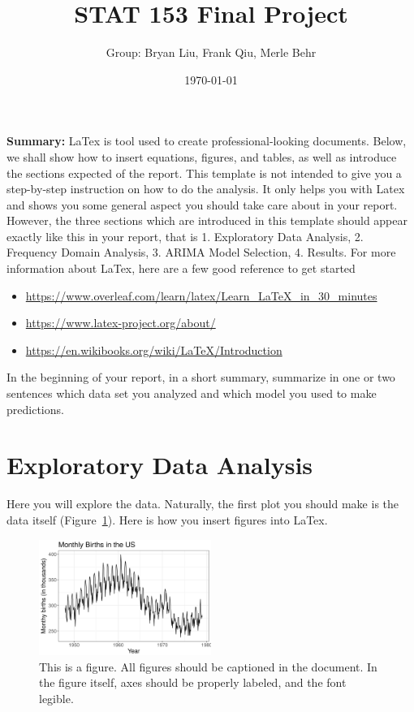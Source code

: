 \documentclass[a4paper]{article}
\title{STAT 153 Final Project}
\author{Group: Bryan Liu, Frank Qiu, Merle Behr}
\date{\today}
\begin{document}
\maketitle

\noindent\textbf{Summary:}
LaTex is tool used to create professional-looking documents. Below, we shall show
how to insert equations, figures, and tables, as well as introduce
the sections expected of the report.
%
This template is not intended to give you a step-by-step instruction on how to do the analysis.
%
It only helps you with Latex and shows you some general aspect you should take care about in your report. 
%
However, the three sections which are introduced in this template should appear exactly like this in your report, that is 1. Exploratory Data Analysis, 2. Frequency Domain Analysis, 3. ARIMA Model Selection, 4. Results.
%
For more information about LaTex, here are a few good reference to get started
\begin{itemize}
\item \url{https://www.overleaf.com/learn/latex/Learn_LaTeX_in_30_minutes}
\item \url{https://www.latex-project.org/about/}
\item \url{https://en.wikibooks.org/wiki/LaTeX/Introduction}
\end{itemize}
In the beginning of your report, in a short summary, summarize in one or two sentences which data set you analyzed and which model you used to make predictions.

\section{Exploratory Data Analysis}
Here you will explore the data. Naturally, the first plot you should make is the
data itself (Figure~\ref{fig:birth_data}). Here is how you insert figures into LaTex.

\begin{figure}[h!]
	\centering
	\includegraphics[width = 0.5\textwidth]{./figures/birth_data.png}
	\caption{This is a figure. All figures should be captioned in the document.
	In the figure itself, axes should be properly labeled, and the font legible. }
	\label{fig:birth_data}
\end{figure}
\end{document}
